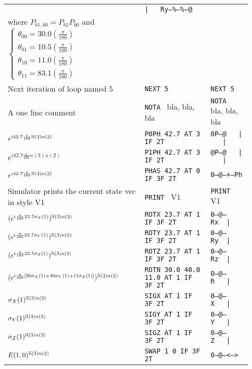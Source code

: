 \documentclass[10pt]{article}
\begin{document}
\begin{center}
\begin{tabular}{|l|l|l|}
& {\tt |\ \ \ Ry--\%---\%---@}
\\
\footnotesize{where $P_{b1,b0}=P_{b1}P_{b0}$ and} $\left\{\begin{array}{l}
\theta_{00}=30.0(\frac{\pi}{180})
\\
\theta_{01}=10.5(\frac{\pi}{180})
\\
\theta_{10}=11.0(\frac{\pi}{180})
\\
\theta_{11}=83.1(\frac{\pi}{180})
\end{array}\right.$
&&
\\
\hline
Next iteration of loop named 5&
{\tt  NEXT 5}&{\tt  NEXT 5}
\\
\hline
A one line comment &
{\tt  NOTA } bla, bla, bla&{\tt  NOTA } bla, bla, bla
\\
\hline
$e^{i 42.7 \frac{\pi}{180} { \overline{n} }(3)n(2)}$ &
{\tt  P0PH 42.7 AT  3 IF 2T}&{\tt 0P--@\ \ \ |\ \ \ |}
\\
\hline
$e^{i 42.7 \frac{\pi}{180} n(3)n(2)}$ &
{\tt  P1PH 42.7 AT  3 IF 2T}&{\tt @P--@\ \ \ |\ \ \ |}
\\
\hline
$e^{i 42.7 \frac{\pi}{180} { \overline{n} }(3)n(2)}$ &
{\tt  PHAS 42.7 AT 0 IF  3F  2T}&{\tt 0---@---+--Ph}
\\
\hline
\footnotesize{Simulator prints the current state vec in style V1} &
{\tt  PRINT } V1&{\tt  PRINT } V1
\\
\hline
$(e^{i\frac{\pi}{180} 23.7 { \sigma_X}(1)})^{{ \overline{n} }(3)n(2)}$ &
{\tt  ROTX  23.7  AT  1  IF  3F  2T}&{\tt 0---@---Rx\ \ |}
\\
\hline
$(e^{i  \frac{\pi}{180} 23.7 { \sigma_Y}(1)})^{{ \overline{n} }(3)n(2)}$ &
{\tt  ROTY  23.7  AT  1  IF  3F  2T} &{\tt 0---@---Ry\ \ |}
\\
\hline
$(e^{i \frac{\pi}{180} 23.7 { \sigma_Z}(1)})^{{ \overline{n} }(3)n(2)}$ &
{\tt  ROTZ  23.7  AT  1  IF  3F  2T}&{\tt 0---@---Rz\ \ |}
\\
\hline
$(e^{
i  \frac{\pi}{180}
[30{ \sigma_X}(1)+ 40{ \sigma_Y}(1) + 11 { \sigma_Z}(1)]
 })^{{ \overline{n} }(3)n(2)}$ &
{\tt  ROTN  30.0 40.0 11.0  AT  1  IF  3F  2T}&{\tt 0---@---R\ \ \ |}
\\
\hline
${ \sigma_X}(1)^{{ \overline{n} }(3)n(2)}$ &
{\tt  SIGX  AT  1  IF  3F  2T}&{\tt 0---@---X\ \ \ |}
\\
\hline
${ \sigma_Y}(1)^{{ \overline{n} }(3)n(2)}$ &
{\tt  SIGY  AT  1  IF  3F  2T}&{\tt 0---@---Y\ \ \ |}
\\
\hline
${ \sigma_Z}(1)^{{ \overline{n} }(3)n(2)}$ &
{\tt  SIGZ  AT  1  IF  3F  2T}&{\tt 0---@---Z\ \ \ |}
\\
\hline
$E(1,0)^{{ \overline{n} }(3)n(2)}$ &
{\tt SWAP  1  0  IF  3F  2T}&{\tt 0---@---<--->}
\\
\hline
\end{tabular}
\end{center}
\end{document}
